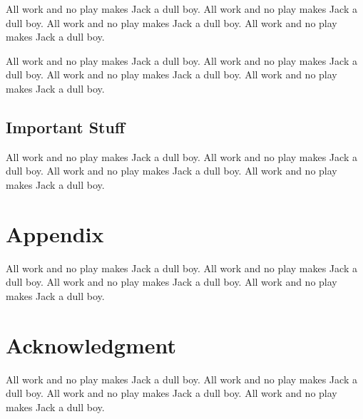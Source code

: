 \documentclass[twocolumn]{article}
\begin{document}
All work and no play makes Jack a dull boy.
All work and no play makes Jack a dull boy.
All work and no play makes Jack a dull boy.
All work and no play makes Jack a dull boy.

All work and no play makes Jack a dull boy.
All work and no play makes Jack a dull boy.
All work and no play makes Jack a dull boy.
All work and no play makes Jack a dull boy.

\subsection{Important Stuff}
\label{sec:conclusions_important_stuff}

All work and no play makes Jack a dull boy.
All work and no play makes Jack a dull boy.
All work and no play makes Jack a dull boy.
All work and no play makes Jack a dull boy.

\section*{Appendix}
\label{sec:appendix}

All work and no play makes Jack a dull boy.
All work and no play makes Jack a dull boy.
All work and no play makes Jack a dull boy.
All work and no play makes Jack a dull boy.

\section*{Acknowledgment}
\label{sec:acknowledgment}

All work and no play makes Jack a dull boy.
All work and no play makes Jack a dull boy.
All work and no play makes Jack a dull boy.
All work and no play makes Jack a dull boy.

\printbibliography








\end{document}
